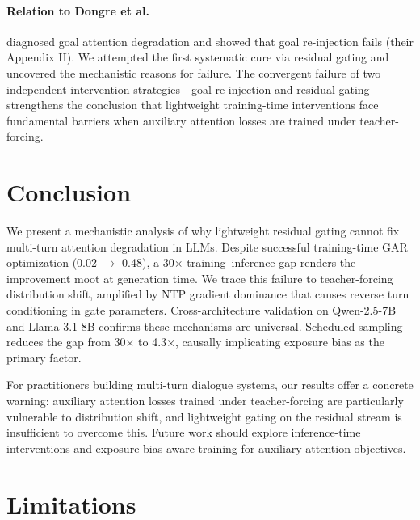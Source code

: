 \documentclass[11pt]{article}
\begin{document}
\paragraph{Relation to Dongre et al.}
\citet{dongre2026} diagnosed goal attention degradation and showed that goal re-injection fails (their Appendix H). We attempted the first systematic cure via residual gating and uncovered the mechanistic reasons for failure. The convergent failure of two independent intervention strategies---goal re-injection and residual gating---strengthens the conclusion that lightweight training-time interventions face fundamental barriers when auxiliary attention losses are trained under teacher-forcing.

\section{Conclusion}

We present a mechanistic analysis of why lightweight residual gating cannot fix multi-turn attention degradation in LLMs. Despite successful training-time GAR optimization (0.02 $\to$ 0.48), a 30$\times$ training--inference gap renders the improvement moot at generation time. We trace this failure to teacher-forcing distribution shift, amplified by NTP gradient dominance that causes reverse turn conditioning in gate parameters. Cross-architecture validation on Qwen-2.5-7B and Llama-3.1-8B confirms these mechanisms are universal. Scheduled sampling reduces the gap from 30$\times$ to 4.3$\times$, causally implicating exposure bias as the primary factor.

For practitioners building multi-turn dialogue systems, our results offer a concrete warning: auxiliary attention losses trained under teacher-forcing are particularly vulnerable to distribution shift, and lightweight gating on the residual stream is insufficient to overcome this. Future work should explore inference-time interventions and exposure-bias-aware training for auxiliary attention objectives.

\section*{Limitations}
\end{document}
